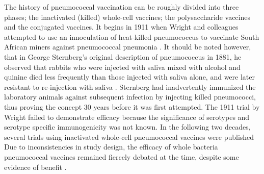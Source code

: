 \documentclass[]{book}
\theoremstyle{definition}
\theoremstyle{definition}
\theoremstyle{definition}
\theoremstyle{remark}
\begin{document}
The history of pneumococcal vaccination can be roughly divided into
three phases; the inactivated (killed) whole-cell vaccines; the
polysaccharide vaccines and the conjugated vaccines. It begins in 1911
when Wright and colleagues attempted to use an innoculation of
heat-killed pneumococcus to vaccinate South African miners against
pneumococcal pneumonia \citep{Wright1914}. It should be noted however,
that in George Sternberg's original description of pneumococcus in 1881,
he observed that rabbits who were injected with saliva mixed with
alcohol and quinine died less frequently than those injected with saliva
alone, and were later resistant to re-injection with saliva
\citep{Austrian1999a, Sternberg1881}. Sternberg had inadvertently
immunized the laboratory animals against subsequent infection by
injecting killed pneumococci, thus proving the concept 30 years before
it was first attempted. The 1911 trial by Wright failed to demonstrate
efficacy because the significance of serotypes and serotype specific
immunogenicity was not known. In the following two decades, several
trials using inactivated whole-cell pneumococcal vaccines were published
\citep{Cecil1918, Lister1916, Lister1936, Maynard1913} Due to
inconsistencies in study design, the efficacy of whole bacteria
pneumococcal vaccines remained fiercely debated at the time, despite
some evidence of benefit \citep{Austrian1999a}.
\end{document}
